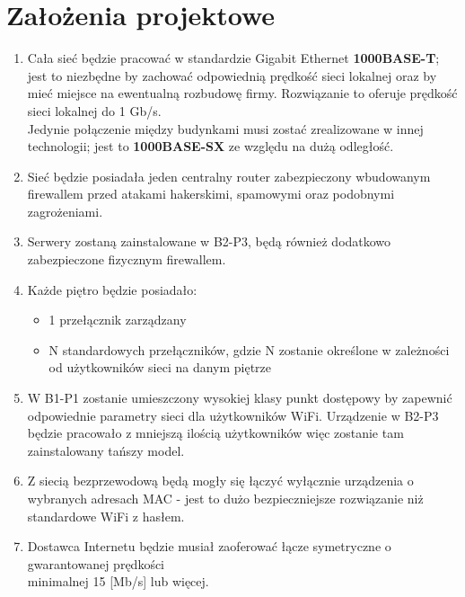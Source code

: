 \documentclass{article}
\begin{document}
\newpage
\section{Założenia projektowe}

\begin{enumerate}
	\item Cała sieć będzie pracować w standardzie Gigabit Ethernet \textbf{1000BASE-T}; jest to niezbędne by zachować odpowiednią prędkość sieci lokalnej oraz by mieć miejsce na ewentualną rozbudowę firmy. Rozwiązanie to oferuje prędkość sieci lokalnej do 1 Gb/s. 
	\\ Jedynie połączenie między budynkami musi zostać zrealizowane w innej technologii; jest to \textbf{1000BASE-SX} ze względu na dużą odległość.
	\item Sieć będzie posiadała jeden centralny router zabezpieczony wbudowanym firewallem przed atakami hakerskimi, spamowymi oraz podobnymi zagrożeniami.
	\item Serwery zostaną zainstalowane w B2-P3, będą również dodatkowo zabezpieczone fizycznym firewallem.
	\item Każde piętro będzie posiadało:
	\begin{itemize}
		\item 1 przełącznik zarządzany
		\item N standardowych przełączników, gdzie N zostanie określone w zależności od użytkowników sieci na danym piętrze
	\end{itemize}
	\item W B1-P1 zostanie umieszczony wysokiej klasy punkt dostępowy by zapewnić odpowiednie parametry sieci dla użytkowników WiFi. Urządzenie w B2-P3 będzie pracowało z mniejszą ilością użytkowników więc zostanie tam zainstalowany tańszy model.
	\item Z siecią bezprzewodową będą mogły się łączyć wyłącznie urządzenia o wybranych adresach MAC - jest to dużo bezpieczniejsze rozwiązanie niż standardowe WiFi z hasłem.
	\item Dostawca Internetu będzie musiał zaoferować łącze symetryczne o gwarantowanej prędkości \\ minimalnej 15 [Mb/s] lub więcej.
\end{enumerate}
\end{document}
